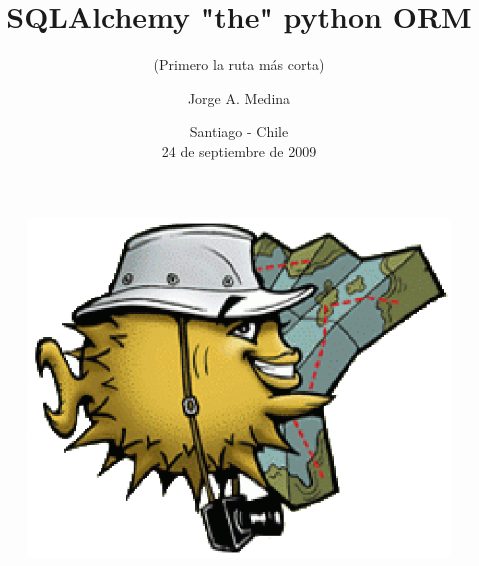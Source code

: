 \documentclass[xcolor=dvipsnames]{beamer}
\title[SQLAlchemy]{SQLAlchemy "the" python ORM}
\subtitle{(Primero la ruta m\'as corta)}
\author{
Jorge A. Medina
}
\institute{Instituto Profesional La Araucana}
\date{Santiago - Chile\\ 24 de septiembre de 2009}
\begin{document}
\fontsize{7}{9}
	\begin{frame}
	\begin{figure}
	\centering 	
	\includegraphics[scale=0.30]{puffyroute.eps}
	\titlepage
	\end{figure}
	\end{frame}
	
\end{document}
